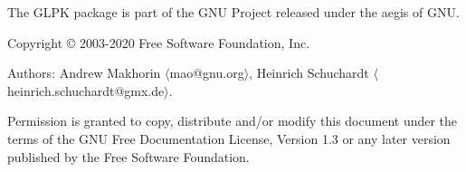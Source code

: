 \documentclass[11pt]{report}
\begin{document}
\thispagestyle{empty}


\newpage

\vspace*{1in}

\vfill

\noindent
The GLPK package is part of the GNU Project released under the aegis of
GNU.

\noindent
Copyright \copyright{} 2003-2020 Free Software Foundation, Inc.

\noindent
Authors: Andrew Makhorin $\langle$mao@gnu.org$\rangle$,
Heinrich Schuchardt $\langle$heinrich.schuchardt@gmx.de$\rangle$.

\noindent
Permission is granted to copy, distribute and/or modify this document
under the terms of the GNU Free Documentation License, Version 1.3 or
any later version published by the Free Software Foundation.


\newpage

{\setlength{\parskip}{0pt}
\tableofcontents
}

\end{document}
